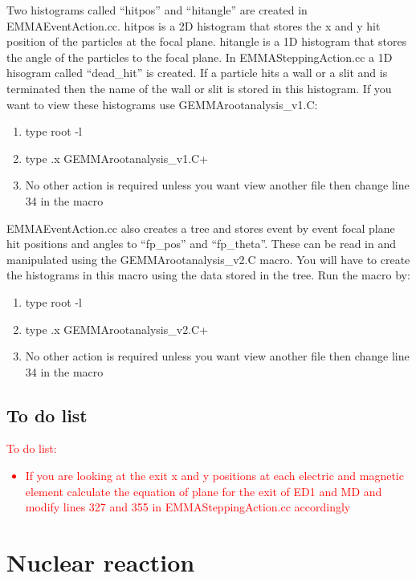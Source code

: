 \documentclass[letter,11pt]{article}
\newcommand{\filefont}[1]{{\scriptsize\ttfamily\selectfont #1}\xspace}
\begin{document}
Two histograms called ``hitpos'' and ``hitangle'' are created in EMMAEventAction.cc. hitpos is a 2D histogram that stores the x and y hit position of the particles at the focal plane. hitangle is a 1D histogram that stores the angle of the particles to the focal plane. In EMMASteppingAction.cc a 1D hisogram called ``dead\_hit'' is created. If a particle hits a wall or a slit and is terminated then the name of the wall or slit is stored in this histogram. If you want to view these histograms use GEMMArootanalysis\_v1.C:\\
\begin{enumerate}
\item type \filefont{root -l}
\item type \filefont{.x GEMMArootanalysis\_v1.C+}
\item No other action is required unless you want view another file then change line 34 in the macro
\end{enumerate}

EMMAEventAction.cc also creates a tree and stores event by event focal plane hit positions and angles to ``fp\_pos'' and ``fp\_theta''. These can be read in and manipulated using the GEMMArootanalysis\_v2.C macro. You will have to create the histograms in this macro using the data stored in the tree. Run the macro by:
\begin{enumerate}
\item type \filefont{root -l}
\item type \filefont{.x GEMMArootanalysis\_v2.C+}
\item No other action is required unless you want view another file then change line 34 in the macro
\end{enumerate}

\subsection{To do list}

\textcolor{red}{To do list:
\begin{itemize}
\item If you are looking at the exit x and y positions at each electric and magnetic element calculate the equation of plane for the exit of ED1 and MD and modify lines 327 and 355 in EMMASteppingAction.cc accordingly
\end{itemize}
}


\section{Nuclear reaction}
\end{document}

